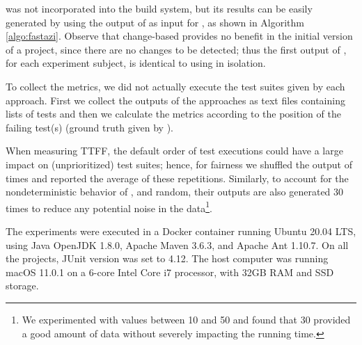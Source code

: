 \fz was not incorporated into the build system, but its results can be easily generated by using the output of \ek as input for \fz, as shown in Algorithm \autoref{algo:fastazi}.
Observe that change-based \tcs provides no benefit in the initial version of a project, since there are no changes to be detected; thus the first output of \fz, for each experiment subject, is identical to using \fs in isolation.

To collect the metrics, we did not actually execute the test suites given by each approach. First we collect the outputs of the approaches as text files containing lists of tests and then we calculate the metrics according to the position of the failing test(s) (ground truth given by \dfj).

When measuring TTFF, the default order of test executions could have a large impact on (unprioritized) test suites; hence, for fairness we shuffled the output of  times and reported the average of these repetitions.
Similarly, to account for the nondeterministic behavior of \fs, \fz and random, their outputs are also generated 30 times to reduce any potential noise in the data\footnote{We experimented with values between 10 and 50 and found that 30 provided a good amount of data without severely impacting the running time.}.

The experiments were executed in a Docker container running Ubuntu 20.04 LTS, using Java OpenJDK 1.8.0, Apache Maven 3.6.3, and Apache Ant 1.10.7.
On all the projects, JUnit version was set to 4.12.
The host computer was running macOS 11.0.1 on a 6-core Intel Core i7 processor, with 32GB RAM and SSD storage.
